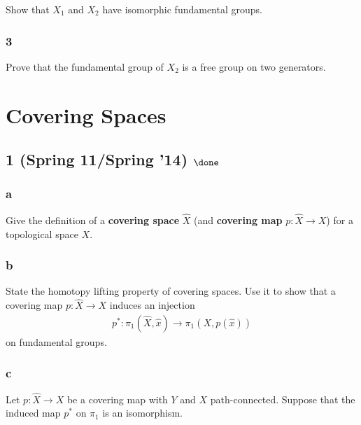 Show that \(X_1\) and \(X_2\) have isomorphic fundamental groups.

\hypertarget{section-8}{%
\subsubsection{3}\label{section-8}}

Prove that the fundamental group of \(X_2\) is a free group on two
generators.

\hypertarget{covering-spaces}{%
\section{Covering Spaces}\label{covering-spaces}}

\hypertarget{spring-11spring-14-done}{%
\subsection{\texorpdfstring{1 (Spring 11/Spring '14)
\(\done\)}{1 (Spring 11/Spring '14) \textbackslash done}}\label{spring-11spring-14-done}}

\hypertarget{a-12}{%
\subsubsection{a}\label{a-12}}

Give the definition of a \textbf{covering space} \(\widehat{X}\) (and
\textbf{covering map} \(p : \widehat{X} \to X\)) for a topological space
\(X\).

\hypertarget{b-12}{%
\subsubsection{b}\label{b-12}}

State the homotopy lifting property of covering spaces. Use it to show
that a covering map \(p : \widehat{X} \to X\) induces an injection
\begin{align*}
p^\ast : \pi_1 (\widehat{X}, \widehat{x}) \to \pi_1 (X, p(\widehat{x}))
\end{align*}
on fundamental groups.

\hypertarget{c-1}{%
\subsubsection{c}\label{c-1}}

Let \(p : \widehat{X} \to X\) be a covering map with \(Y\) and \(X\)
path-connected. Suppose that the induced map \(p^\ast\) on \(\pi_1\) is
an isomorphism.

